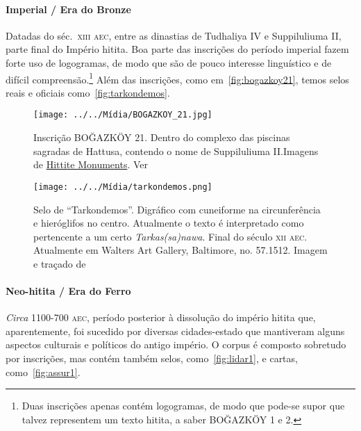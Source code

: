 \paragraph{Imperial \slash{} Era do Bronze} Datadas do séc.\ \textsc{xiii aec},
entre as dinastias de Tudhaliya IV e Suppiluliuma II, parte final do Império
hitita.
Boa parte das inscrições do período imperial fazem forte uso de logogramas,
de modo que são de pouco interesse linguístico e de difícil
compreensão.\footnote{Duas inscrições apenas contém logogramas, de modo que
	pode-se supor que talvez representem um texto hitita, a saber BOĞAZKÖY 1 e 2.}
Além das inscrições, como em~\autoref{fig:bogazkoy21},
temos selos reais e oficiais
como~\autoref{fig:tarkondemos}.

\begin{figure}[htb]
	\begin{center}
		\texttt{[image: ../../Mídia/BOGAZKOY\_21.jpg]}
		\caption{Inscrição BOĞAZKÖY 21. Dentro do complexo das piscinas sagradas de
			Hattusa, contendo o nome de Suppiluliuma II.\@ Imagens de
			\href{https://www.hittitemonuments.com/bogazkoy/}{Hittite
				Monuments}. Ver~\citet[p. 48ff.]{CHLI3}
		}\label{fig:bogazkoy21}
	\end{center}
	\begin{center}
		\texttt{[image: ../../Mídia/tarkondemos.png]}
	\end{center}
	\caption{Selo de ``Tarkondemos''. Digráfico com cuneiforme na circunferência e
		hieróglifos no centro. Atualmente o texto é interpretado como pertencente a
		um certo \emph{Tarkas{(sa)}nawa}. Final do século \textsc{xii aec}.
		Atualmente em Walters Art Gallery, Baltimore, no. 57.1512.
		Imagem e traçado de~\citet[p. 45f.; \emph{plate} 32]{CHLI3}
	}\label{fig:tarkondemos}
\end{figure}

\paragraph{Neo-hitita \slash{} Era do Ferro} \emph{Circa} 1100-700 \textsc{aec},
período posterior à dissolução do império hitita que, aparentemente, foi
sucedido por diversas cidades-estado que mantiveram alguns aspectos
culturais e políticos do antigo império.
O corpus é composto sobretudo por inscrições, mas contém também selos,
como~\autoref{fig:lidar1}, e cartas, como~\autoref{fig:assur1}.

